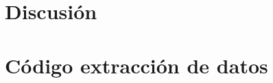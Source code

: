 \section{Discusión}%
\label{sec:discusión}

\pagebreak
\appendix

\section{Código extracción de datos}%
\label{sec:codigo_extraccion_de_datos}





